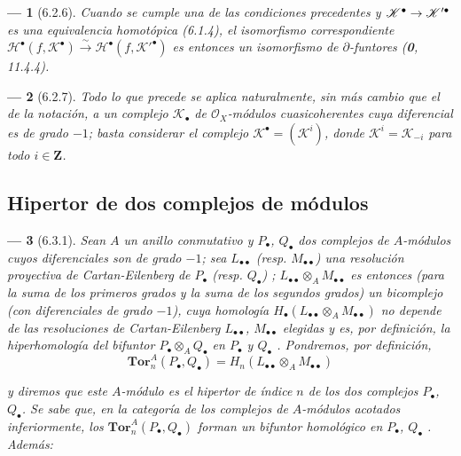 \documentclass[10pt,oneside,openany]{book}
\theoremstyle{egaenv}\newtheorem*{env}{---}
\theoremstyle{egastatement}
\theoremstyle{egadescription}
\newcommand{\oldpage}[2][]{\marginnote{\normalfont\scriptsize\textbf{#1}\,|\,#2}\ignorespaces}
\renewcommand{\to}{\mathchoice{\longrightarrow}{\rightarrow}{\rightarrow}{\rightarrow}}
\begin{document}
\begin{env}[6.2.6]
Cuando se cumple una de las condiciones precedentes y
$\mathscr K^\bullet\to\mathscr K'^\bullet$ es una equivalencia homotópica (6.1.4), el
isomorfismo correspondiente
$\mathscr H^\bullet(f,\mathscr K^\bullet)\xrightarrow{\sim}
\mathscr H^\bullet(f,\mathscr K'^\bullet)$ es entonces un isomorfismo de
$\partial$-funtores (\textbf 0, 11.4.4).
\end{env}

\begin{env}[6.2.7]
Todo lo que precede se aplica naturalmente, sin más cambio que el de la
notación, a un complejo $\mathscr K_\bullet$ de $\mathscr O_X$-módulos
cuasicoherentes cuya diferencial es de grado $-1$; basta considerar el
complejo $\mathscr K^\bullet=(\mathscr K^i)$, donde
$\mathscr K^i=\mathscr K_{-i}$ para todo $i\in\mathbf Z$.
\end{env}

\subsection{Hipertor de dos complejos de módulos}
\label{subsection:III.6.3}
\label{subsection:III.6.3.fr}

\begin{env}[6.3.1]
\label{III.6.3.1}
Sean $A$ un anillo conmutativo y $P_\bullet$, $Q_\bullet$ dos complejos de
$A$-módulos cuyos diferenciales son de grado $-1$; sea
$L_{\bullet\bullet}$ (resp. $M_{\bullet\bullet}$) una resolución proyectiva
de Cartan-Eilenberg de $P_\bullet$ (resp. $Q_\bullet$)
;
$L_{\bullet\bullet}\otimes_A M_{\bullet\bullet}$ es entonces (para la suma
de los primeros grados y la suma de los segundos grados) un bicomplejo (con
diferenciales de grado $-1$), cuya homología
$H_\bullet(L_{\bullet\bullet}\otimes_A M_{\bullet\bullet})$ no depende de las
resoluciones de Cartan-Eilenberg $L_{\bullet\bullet}$,
$M_{\bullet\bullet}$ elegidas y es, por definición, la hiperhomología del
bifuntor $P_\bullet\otimes_A Q_\bullet$ en $P_\bullet$ y $Q_\bullet$
. Pondremos, por definición,
\[
  \mathbf{Tor}_n^A(P_\bullet,Q_\bullet)
  =H_n(L_{\bullet\bullet}\otimes_A M_{\bullet\bullet})
  \tag{6.3.1.1}\label{III.6.3.1.1.fr}
\]

\oldpage[III]{142}

y diremos que este $A$-módulo es el \emph{hipertor} de índice $n$ de los dos
complejos $P_\bullet$, $Q_\bullet$. Se sabe que, en la categoría de los
complejos de $A$-módulos \emph{acotados inferiormente}, los
$\mathbf{Tor}_n^A(P_\bullet,Q_\bullet)$ forman un \emph{bifuntor homológico} en
$P_\bullet$, $Q_\bullet$ . Además:
\end{env}
\end{document}
